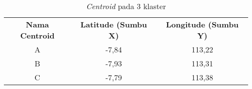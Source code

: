 \begin{table}[H]
\footnotesize
\centering
\begin{tabular}{ccc}
\rowcolor[HTML]{4472C4} 
{\color[HTML]{FFFFFF} \textbf{Nama   Centroid}} & {\color[HTML]{FFFFFF} \textbf{Latitude (Sumbu X)}} & {\color[HTML]{FFFFFF} \textbf{Longitude (Sumbu Y)}} \\
\rowcolor[HTML]{D9E1F2} 
A & -7,84 & 113,22 \\
B & -7,93 & 113,31 \\
\rowcolor[HTML]{D9E1F2} 
C & -7,79 & 113,38
\end{tabular}
\caption{\textit{Centroid} pada 3 klaster}
\label{tab:center3}
\end{table}